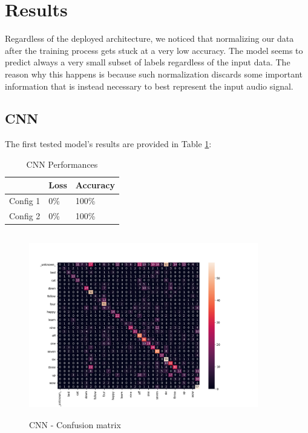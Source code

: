 
\section{Results}
\label{sec:results}

\noindent Regardless of the deployed architecture, we noticed that normalizing our data after the training process gets stuck at a very low accuracy. The model seems to predict always a very small subset of labels regardless of the input data. The reason why this happens is because such normalization discards some important information that is instead necessary to best represent the input audio signal.

\subsection{\textbf{CNN}}
The first tested model's results are provided in Table \ref{table:cnn_performances}:\\
\begin{table}[h!]
\centering
\begin{tabular}{ p{1.5cm}|p{1.5cm}|p{1.5cm}| }
 \hline
   & Loss & Accuracy\\
\hline
Config 1 & 0\% & 100\%  \\
Config 2 & 0\% & 100\% \\
\hline
\end{tabular}
\caption{CNN Performances}
\label{table:cnn_performances}
\end{table}

\begin{figure}[h]
			\centering
	    	\includegraphics[width=10cm, height=8cm]{conf_matrix_cnn_dii_cm}
	    	\caption{CNN - Confusion matrix}
	    	\label{fig:conf_matrix_cnn}
\end{figure} 



